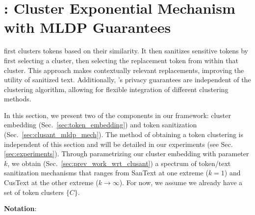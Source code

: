 
\section{\clusant: Cluster Exponential Mechanism with MLDP Guarantees}

\clusant first clusters tokens based on their similarity. It then sanitizes sensitive tokens by first selecting a cluster, then selecting the replacement token from within that cluster. This approach makes contextually relevant replacements, improving the utility of sanitized text. Additionally, \clusant's privacy guarantees are independent of the clustering algorithm, allowing for flexible integration of different clustering methods.

In this section, we present two of the components in our \clusant framework: cluster embedding (Sec.~\ref{sec:token_embedding}) and token sanitization (Sec.~\ref{sec:clusant_mldp_mech}). The method of obtaining a token clustering  is independent of this section and will be detailed in our experiments (see Sec. \ref{sec:experiments}). Through parametrizing our cluster embedding with parameter $k$, we obtain (Sec.~\ref{sec:prev_work_wrt_clusant})  a spectrum of token/text sanitization mechanisms that ranges from SanText at one extreme ($k = 1$) and CusText at the other extreme ($k \rightarrow \infty$). 
 For now, we assume we already have a set of token clusters $\{C\}$. 

\vspace{0.5em}

\noindent
\textbf{Notation}:

